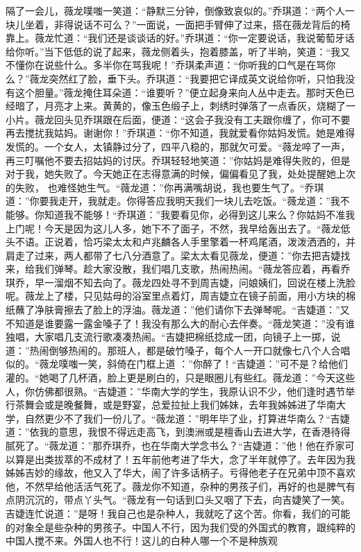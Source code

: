 \documentclass{article}
\begin{document}
隔了一会儿，薇龙噗嗤一笑道：“静默三分钟，倒像致哀似的。”乔琪道：“两个人一块儿坐着，非得说话不可么？”一面说，一面把手臂伸了过来，搭在薇龙背后的椅靠上。薇龙忙道：“我们还是谈谈话的好。”乔琪道：“你一定要说话，我说葡萄牙话给你听。”当下低低的说了起来，薇龙侧着头，抱着膝盖，听了半晌，笑道：“我又不懂你在说些什么。多半你在骂我呢！”乔琪柔声道：“你听我的口气是在骂你么？”薇龙突然红了脸，垂下头。乔琪道：“我要把它译成英文说给你听，只怕我没有这个胆量。”薇龙掩住耳朵道：“谁要听？”便立起身来向人丛中走去。那时天色已经暗了，月亮才上来。黄黄的，像玉色缎子上，刺绣时弹落了一点香灰，烧糊了一小片。薇龙回头见乔琪跟在后面，便道：“这会子我没有工夫跟你缠了，你可不要再去搅扰我姑妈。谢谢你！”乔琪道：“你不知道，我就爱看你姑妈发慌。她是难得发慌的。一个女人，太镇静过分了，四平八稳的，那就欠可爱。“薇龙啐了一声，再三叮嘱他不要去招姑妈的讨厌。乔琪轻轻地笑道：”你姑妈是难得失败的，但是对于我，她失败了。今天她正在志得意满的时候，偏偏看见了我，处处提醒她上次的失败，
\newpage
也难怪她生气。“薇龙道：”你再满嘴胡说，我也要生气了。“乔琪道：”你要我走开，我就走。你得答应我明天我们一块儿去吃饭。“薇龙道：”我不能够。你知道我不能够！“乔琪道：”我要看见你，必得到这儿来么？你姑妈不准我上门呢！今天是因为这儿人多，她下不了面子，不然，我早给轰出去了。“薇龙低头不语。正说着，恰巧梁太太和卢兆麟各人手里擎着一杯鸡尾酒，泼泼洒洒的，并肩走了过来，两人都带了七八分酒意了。梁太太看见薇龙，便道：”你去把吉婕找来，给我们弹琴。趁大家没散，我们唱几支歌，热闹热闹。“薇龙答应着，再看乔琪乔，早一溜烟不知去向了。薇龙四处寻不到周吉婕，问娘姨们，回说在楼上洗脸呢。薇龙上了楼，只见姑母的浴室里点着灯，周吉婕立在镜子前面，用小方块的棉纸蘸了净肤膏擦去了脸上的浮油。薇龙道：”他们请你下去弹琴呢。“吉婕道：”又不知道是谁要露一露金嗓子了！我没有那么大的耐心去伴奏。“薇龙笑道：”没有谁独唱，大家唱几支流行歌凑凑热闹。“吉婕把棉纸捻成一团，向镜子上一掷，说道：”热闹倒够热闹的。那班人，都是破竹嗓子，每个人一开口就像七八个人合唱似的。“薇龙噗嗤一笑，斜倚在门框上道
\newpage
：”你醉了！“吉婕道：”可不是？给他们灌的。“她喝了几杯酒，脸上更是刷白的，只是眼圈儿有些红。薇龙道：”今天这些人，你仿佛都很熟。“吉婕道：”华南大学的学生，我原认识不少，他们逢时遇节举行茶舞会或是晚餐舞，或是野宴，总爱拉扯上我们姊妹，去年我姊姊进了华南大学，自然更少不了我们一份儿了。“薇龙道：”明年毕了业，打算进华南么？“吉婕道：”依我的意思，我恨不得远走高飞，到澳洲或是檀香山去进大学，在香港待得腻死了。“薇龙道：”那乔琪乔，也在华南大学念书么？“吉婕道：”他！他在乔家可以算是出类拔萃的不成材了！五年前他考进了华大，念了半年就停了。去年因为我姊姊吉妙的缘故，他又入了华大，闹了许多话柄子。亏得他老子在兄弟中顶不喜欢他，不然早给他活活气死了。薇龙你不知道，杂种的男孩子们，再好的也是脾气有点阴沉沉的，带点丫头气。“薇龙有一句话到口头又咽了下去，向吉婕笑了一笑。吉婕连忙说道：”是呀！我自己也是杂种人，我就吃了这个苦。你看，我们的可能的对象全是些杂种的男孩子。中国人不行，因为我们受的外国式的教育，跟纯粹的中国人搅不来。外国人也不行！这儿的白种人哪一个不是种族观
\end{document}
